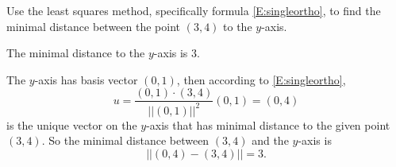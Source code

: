 \documentclass{ximera}
\begin{document}
\begin{exercise} \label{YZ_9.1.1B}
Use the least squares method, specifically formula \eqref{E:singleortho}, to 
find the minimal distance between the point $(3,4)$ to the $y$-axis.

\begin{solution}
\ans
The minimal distance to the $y$-axis is $3$.

\soln 
The $y$-axis has basis vector $(0,1)$, then according to \eqref{E:singleortho},  
\[
u = \frac{(0,1)\cdot (3,4)}{||(0,1)||^2}(0,1) = (0,4)
\]
is the unique vector on the $y$-axis that has minimal distance to the given point $(3,4)$. So the minimal distance between $(3,4)$ and the $y$-axis is 
\[
||(0,4)-(3,4)|| = 3.
\]
\end{solution}
\end{exercise}
\end{document}
